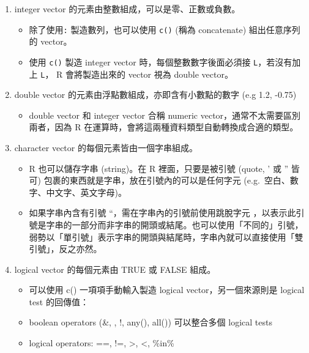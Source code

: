 \begin{enumerate}
\def\labelenumi{\arabic{enumi}.}
\tightlist
\item
  integer vector 的元素由整數組成，可以是零、正數或負數。

  \begin{itemize}
  \tightlist
  \item
    除了使用\texttt{:} 製造數列，也可以使用 \texttt{c()} (稱為
    concatenate) 組出任意序列的 vector。
  \item
    使用 \texttt{c()} 製造 integer vector 時，每個整數數字後面必須接
    \texttt{L}，若沒有加上 \texttt{L}， R 會將製造出來的 vector 視為
    double vector。
  \end{itemize}
\item
  double vector 的元素由浮點數組成，亦即含有小數點的數字 (e.g 1.2,
  -0.75)

  \begin{itemize}
  \tightlist
  \item
    double vector 和 integer vector 合稱 numeric
    vector，通常不太需要區別兩者，因為 R
    在運算時，會將這兩種資料類型自動轉換成合適的類型。
  \end{itemize}
\item
  character vector 的每個元素皆由一個字串組成。

  \begin{itemize}
  \tightlist
  \item
    R 也可以儲存字串 (string)。在 R 裡面，只要是被引號 (quote, ' 或 ''
    皆可) 包裹的東西就是字串，放在引號內的可以是任何字元
    (e.g.~空白、數字、中文字、英文字母)。
  \item
    如果字串內含有引號 ``，需在字串內的引號前使用跳脫字元
    ，以表示此引號是字串的一部分而非字串的開頭或結尾。也可以使用「不同的」引號，弱勢以「單引號」表示字串的開頭與結尾時，字串內就可以直接使用「雙引號」，反之亦然。
  \end{itemize}
\item
  logical vector 的每個元素由 TRUE 或 FALSE 組成。

  \begin{itemize}
  \tightlist
  \item
    可以使用 c() 一項項手動輸入製造 logical vector，另一個來源則是
    logical test 的回傳值：
  \item
    boolean operators (\&, \textbar, !, any(), all()) 可以整合多個
    logical tests
  \item
    logical operators: ==, !=, \textgreater, \textless, \%in\%
  \end{itemize}
\end{enumerate}

